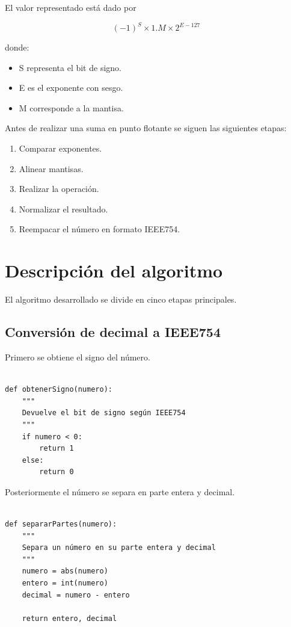 \documentclass[11pt]{article}
\begin{document}
El valor representado está dado por

\[
(-1)^S \times 1.M \times 2^{E-127}
\]

donde:

\begin{itemize}
\item S representa el bit de signo.
\item E es el exponente con sesgo.
\item M corresponde a la mantisa.
\end{itemize}

Antes de realizar una suma en punto flotante se siguen las siguientes
etapas:

\begin{enumerate}
\item Comparar exponentes.
\item Alinear mantisas.
\item Realizar la operación.
\item Normalizar el resultado.
\item Reempacar el número en formato IEEE754.
\end{enumerate}

\section{Descripción del algoritmo}
\label{sec:orgf95e6c6}

El algoritmo desarrollado se divide en cinco etapas principales.

\subsection{Conversión de decimal a IEEE754}
\label{sec:org95b4523}

Primero se obtiene el signo del número.

\begin{verbatim}

def obtenerSigno(numero):
    """
    Devuelve el bit de signo según IEEE754
    """
    if numero < 0:
        return 1
    else:
        return 0

\end{verbatim}

Posteriormente el número se separa en parte entera y decimal.

\begin{verbatim}

def separarPartes(numero):
    """
    Separa un número en su parte entera y decimal
    """
    numero = abs(numero)
    entero = int(numero)
    decimal = numero - entero

    return entero, decimal

\end{verbatim}
\end{document}
